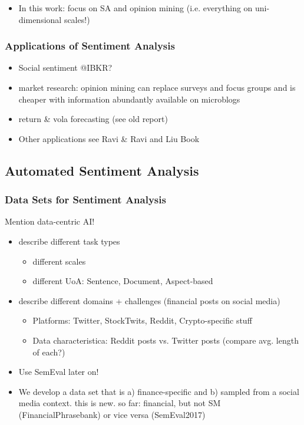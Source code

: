 \begin{itemize}[noitemsep]
	\item In this work: focus on SA and opinion mining (i.e. everything on uni-dimensional scales!)
\end{itemize}


\newpage %




\subsubsection{Applications of Sentiment Analysis}

\begin{itemize}
	\item Social sentiment @IBKR?
\end{itemize}


\begin{itemize}[noitemsep]
	\item market research: opinion mining can replace surveys and focus groups and is cheaper with information abundantly available on microblogs
	\item return \& vola forecasting (see old report)
	\item Other applications see Ravi \& Ravi and Liu Book
\end{itemize}

\subsection{Automated Sentiment Analysis}


\subsubsection{Data Sets for Sentiment Analysis}
Mention data-centric AI!
\begin{itemize}[noitemsep]
	\item describe different task types
	\begin{itemize}
		\item different scales
		\item different UoA: Sentence, Document, Aspect-based
	\end{itemize}
	\item describe different domains + challenges (financial posts on social media)
	\begin{itemize}[noitemsep]
		\item Platforms: Twitter, StockTwits, Reddit, Crypto-specific stuff
		\item Data characteristica: Reddit posts vs. Twitter posts (compare avg. length of each?)
\end{itemize}
	\item Use SemEval later on!
	\item We develop a data set that is a) finance-specific and b) sampled from a social media context. this is new. so far: financial, but not SM (FinancialPhrasebank) or vice versa (SemEval2017)
\end{itemize}

